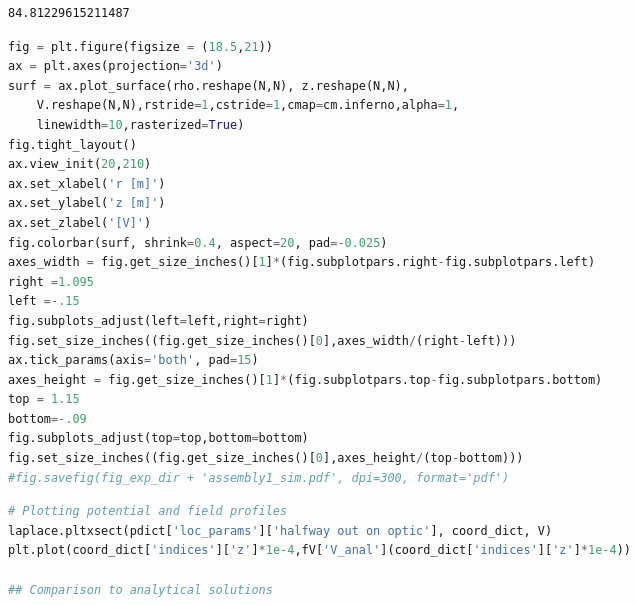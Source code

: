 \begin{spacing}{1.2} \begin{lstlisting}
84.81229615211487
\end{lstlisting} \end{spacing}

\begin{spacing}{1.2} \begin{lstlisting}[frame=single, language=Python]
fig = plt.figure(figsize = (18.5,21))
ax = plt.axes(projection='3d') 
surf = ax.plot_surface(rho.reshape(N,N), z.reshape(N,N),
    V.reshape(N,N),rstride=1,cstride=1,cmap=cm.inferno,alpha=1,
    linewidth=10,rasterized=True)
fig.tight_layout()
ax.view_init(20,210)
ax.set_xlabel('r [m]')
ax.set_ylabel('z [m]')
ax.set_zlabel('[V]')
fig.colorbar(surf, shrink=0.4, aspect=20, pad=-0.025)
axes_width = fig.get_size_inches()[1]*(fig.subplotpars.right-fig.subplotpars.left)
right =1.095
left =-.15
fig.subplots_adjust(left=left,right=right) 
fig.set_size_inches((fig.get_size_inches()[0],axes_width/(right-left)))
ax.tick_params(axis='both', pad=15)
axes_height = fig.get_size_inches()[1]*(fig.subplotpars.top-fig.subplotpars.bottom)
top = 1.15
bottom=-.09
fig.subplots_adjust(top=top,bottom=bottom)             
fig.set_size_inches((fig.get_size_inches()[0],axes_height/(top-bottom)))
#fig.savefig(fig_exp_dir + 'assembly1_sim.pdf', dpi=300, format='pdf')
\end{lstlisting} \end{spacing}

\begin{spacing}{1.2} \begin{lstlisting}[frame=single, language=Python]
# Plotting potential and field profiles
laplace.pltxsect(pdict['loc_params']['halfway out on optic'], coord_dict, V)
plt.plot(coord_dict['indices']['z']*1e-4,fV['V_anal'](coord_dict['indices']['z']*1e-4))

## Comparison to analytical solutions
\end{lstlisting} \end{spacing}


